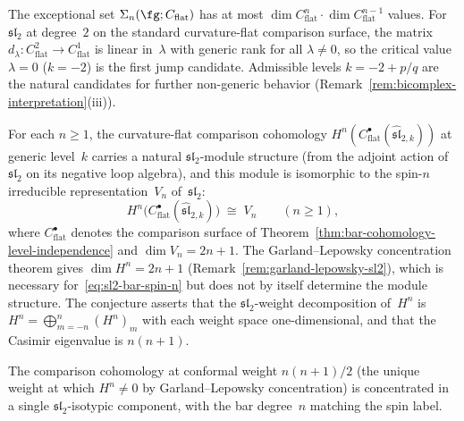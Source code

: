 \begin{remark}
\label{rem:special-level-values}
The exceptional set
$\Sigma_n(\fg;C_{\mathrm{flat}})$ has at most
$\dim C^n_{\mathrm{flat}}\cdot\dim C^{n-1}_{\mathrm{flat}}$
values.  For $\mathfrak{sl}_2$ at degree~$2$ on the standard
curvature-flat comparison surface, the matrix
$d_\lambda\colon C^2_{\mathrm{flat}}\to C^1_{\mathrm{flat}}$ is
linear in~$\lambda$ with generic rank for all $\lambda\neq0$,
so the critical value $\lambda=0$ ($k=-2$) is the first jump
candidate.  Admissible levels $k=-2+p/q$ are the natural candidates
for further non-generic behavior
(Remark~\textup{\ref{rem:bicomplex-interpretation}}\textup{(iii)}).
\end{remark}

\begin{conjecture}
\label{conj:sl2-bar-spin-representations}
\ClaimStatusConjectured
{}
For each $n \geq 1$, the curvature-flat comparison cohomology
$H^n(C^\bullet_{\mathrm{flat}}(\widehat{\mathfrak{sl}}_{2,k}))$
at generic level~$k$ carries a natural
$\mathfrak{sl}_2$-module structure
\textup{(}from the adjoint action of~$\mathfrak{sl}_2$
on its negative loop algebra\textup{)},
and this module is isomorphic to the spin-$n$
irreducible representation~$V_n$ of~$\mathfrak{sl}_2$:
\begin{equation}\label{eq:sl2-bar-spin-n}
 H^n\bigl(C^\bullet_{\mathrm{flat}}
  (\widehat{\mathfrak{sl}}_{2,k})\bigr)
 \;\cong\; V_n
 \qquad(n \geq 1),
\end{equation}
where \(C^\bullet_{\mathrm{flat}}\) denotes the comparison surface of
Theorem~\ref{thm:bar-cohomology-level-independence} and
$\dim V_n = 2n + 1$. The Garland--Lepowsky
concentration theorem gives $\dim H^n = 2n + 1$
\textup{(}Remark~\textup{\ref{rem:garland-lepowsky-sl2}}),
which is necessary for~\eqref{eq:sl2-bar-spin-n} but does
not by itself determine the module structure. The
conjecture asserts that the $\mathfrak{sl}_2$-weight
decomposition of~$H^n$ is
$H^n = \bigoplus_{m = -n}^{n} (H^n)_m$
with each weight space one-dimensional, and that the
Casimir eigenvalue is $n(n+1)$.

The comparison cohomology at conformal weight $n(n{+}1)/2$
\textup{(}the unique weight at which $H^n \neq 0$
by Garland--Lepowsky concentration\textup{)} is
concentrated in a single $\mathfrak{sl}_2$-isotypic
component, with the bar degree~$n$ matching the
spin label.
\end{conjecture}

